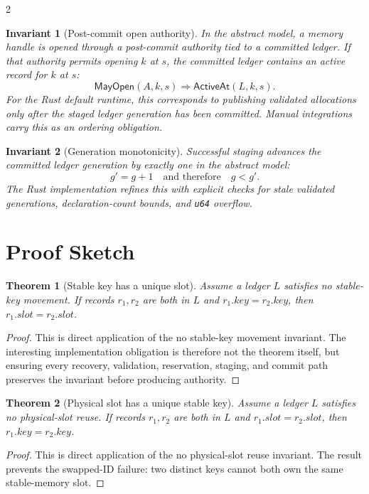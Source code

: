 \documentclass[11pt]{article}
\newtheorem{invariant}{Invariant}
\newtheorem{theorem}{Theorem}
\begin{document}
\begin{multicols}{2}
\begin{invariant}[Post-commit open authority]
In the abstract model, a memory handle is opened through a post-commit authority
tied to a committed ledger. If that authority permits opening \(k\) at \(s\),
the committed ledger contains an active record for \(k\) at \(s\):
\[
  \mathsf{MayOpen}(A,k,s) \Rightarrow \mathsf{ActiveAt}(L,k,s).
\]
For the Rust default runtime, this corresponds to publishing validated
allocations only after the staged ledger generation has been committed. Manual
integrations carry this as an ordering obligation.
\end{invariant}

\begin{invariant}[Generation monotonicity]
Successful staging advances the committed ledger generation by exactly one in
the abstract model:
\[
  g' = g + 1 \quad \text{and therefore} \quad g < g'.
\]
The Rust implementation refines this with explicit checks for stale validated
generations, declaration-count bounds, and \texttt{u64} overflow.
\end{invariant}

\section{Proof Sketch}

\begin{theorem}[Stable key has a unique slot]
Assume a ledger \(L\) satisfies no stable-key movement. If records \(r_1,r_2\)
are both in \(L\) and \(r_1.key = r_2.key\), then \(r_1.slot = r_2.slot\).
\end{theorem}

\begin{proof}
This is direct application of the no stable-key movement invariant. The
interesting implementation obligation is therefore not the theorem itself, but
ensuring every recovery, validation, reservation, staging, and commit path
preserves the invariant before producing authority.
\end{proof}

\begin{theorem}[Physical slot has a unique stable key]
Assume a ledger \(L\) satisfies no physical-slot reuse. If records \(r_1,r_2\)
are both in \(L\) and \(r_1.slot = r_2.slot\), then \(r_1.key = r_2.key\).
\end{theorem}

\begin{proof}
This is direct application of the no physical-slot reuse invariant. The result
prevents the swapped-ID failure: two distinct keys cannot both own the same
stable-memory slot.
\end{proof}


\end{multicols}
\end{document}
